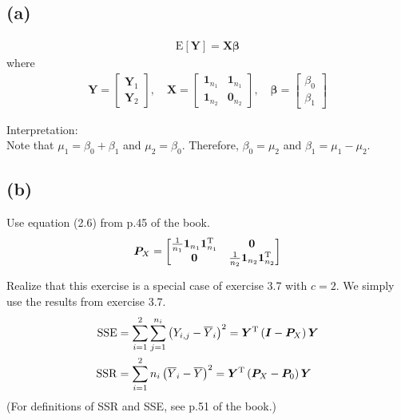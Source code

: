 \documentclass[a4paper]{article}
\newcommand{\E}{\mathrm{E}}
\begin{document}
\subsection{(a)}
\begin{align*}
\E[\bm{Y}] = \bm{X}\bm{\beta}
\end{align*}
where
\begin{align*}
\bm{Y} =
\begin{bmatrix}
\bm{Y}_{1}\\
\bm{Y}_{2}
\end{bmatrix}
, \quad
\bm{X} = 
\begin{bmatrix}
\bm{1}_{n_{1}} & \bm{1}_{n_{1}}\\
\bm{1}_{n_{2}} & \bm{0}_{n_{2}}
\end{bmatrix}
, \quad
\bm{\beta} =
\begin{bmatrix}
\beta_{0}\\
\beta_{1}
\end{bmatrix}
\end{align*}

Interpretation:\\
Note that $\mu_{1} = \beta_{0} + \beta_{1}$ and $\mu_{2} = \beta_{0}$. Therefore, $\beta_{0} = \mu_{2}$ and $\beta_{1} = \mu_{1} - \mu_{2}$.


\subsection{(b)}
Use equation (2.6) from p.45 of the book.
\begin{align*}
\bm{P}_{X} = 
\begin{bmatrix}
\frac{1}{n_{1}}\bm{1}_{n_{1}}\bm{1}_{n_{1}}^{\rm T} & \bm{0}\\
\bm{0} & \frac{1}{n_{2}}\bm{1}_{n_{2}}\bm{1}_{n_{2}}^{\rm T}
\end{bmatrix}
\end{align*}

Realize that this exercise is a special case of exercise 3.7 with $c = 2$. We simply use the results from exercise 3.7.
\begin{align*}
\mathrm{SSE} &= \sum_{i=1}^{2} \sum_{j=1}^{n_{i}} \left(Y_{i,j} - \overline{Y}_{i} \right)^2 = \bm{Y}^{\rm T}\left(\bm{I} -\bm{P}_{X}\right)\bm{Y}\\
\mathrm{SSR} &= \sum_{i=1}^{2} n_{i}\left(\overline{Y}_{i} - \overline{Y}\right)^2 = \bm{Y}^{\rm T}\left(\bm{P}_{X} -\bm{P}_{0} \right)\bm{Y}
\end{align*}
(For definitions of SSR and SSE, see p.51 of the book.)
\end{document}
